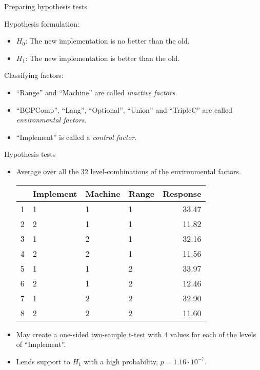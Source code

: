 \documentclass[english,usenames,dvipsnames,aspectratio=169]{beamer}
\begin{document}
\begin{frame}{Preparing hypothesis tests}

Hypothesis formulation:
  \begin{itemize}
  \item $H_0$: The new implementation is no better than the old.
  \item $H_1$: The new implementation is better than the old.
  \end{itemize}

Classifying factors:
  \begin{itemize}
  \item ``Range'' and ``Machine'' are called \emph{inactive factors}.
  \item ``BGPComp'', ``Lang'', ``Optional'', ``Union'' and ``TripleC''
    are called \emph{environmental factors}.
  \item ``Implement'' is called a \emph{control factor}.
  \end{itemize}

\end{frame}
\begin{frame}{Hypothesis tests}

\begin{itemize}
\item Average over all the 32 level-combinations of the environmental
  factors. 

\begin{table}[ht]
\begin{center}
\begin{tabular}{rlll|r}
  \hline
 & Implement & Machine & Range & Response \\ 
  \hline
1 & 1 & 1 & 1 & 33.47 \\ 
  2 & 2 & 1 & 1 & 11.82 \\ 
  3 & 1 & 2 & 1 & 32.16 \\ 
  4 & 2 & 2 & 1 & 11.56 \\ 
  5 & 1 & 1 & 2 & 33.97 \\ 
  6 & 2 & 1 & 2 & 12.46 \\ 
  7 & 1 & 2 & 2 & 32.90 \\ 
  8 & 2 & 2 & 2 & 11.60 \\ 
   \hline
\end{tabular}
\end{center}
\end{table}

\item May create a one-sided two-sample t-test with 4 values for each
  of the levels of ``Implement''.
\item Lends support to $H_1$ with a high probability, $p=1.16 \cdot
10^{-7}$.

\end{itemize}

\end{frame}
\end{document}
